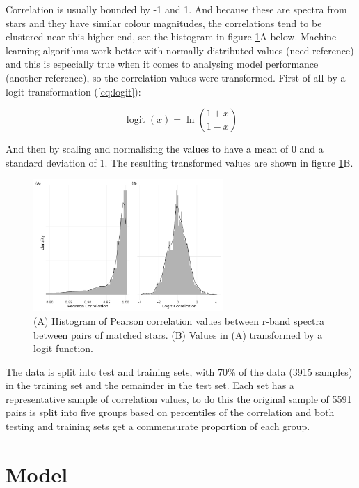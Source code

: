 \documentclass[]{elsarticle} %
\begin{document}
Correlation is usually bounded by -1 and 1. And because these are
spectra from stars and they have similar colour magnitudes, the
correlations tend to be clustered near this higher end, see the
histogram in figure \ref{fig:histograms}A below. Machine learning
algorithms work better with normally distributed values (need reference)
and this is especially true when it comes to analysing model performance
(another reference), so the correlation values were transformed. First
of all by a logit transformation (\ref{eq:logit}):

\begin{equation}
  \displaystyle \operatorname {logit} (x)=\ln \left({\frac {1+x}{1-x}}\right)
  \label{eq:logit}
\end{equation}

And then by scaling and normalising the values to have a mean of 0 and a
standard deviation of 1. The resulting transformed values are shown in
figure \ref{fig:histograms}B.

\begin{figure}
  \includegraphics[width=\columnwidth, height = 5cm]{figures/histograms}
    \caption{(A) Histogram of Pearson correlation values between r-band spectra between pairs of matched stars. (B) Values in (A) transformed by a logit function.}
    \label{fig:histograms}
\end{figure}

The data is split into test and training sets, with 70\% of the data
(3915 samples) in the training set and the remainder in the test set.
Each set has a representative sample of correlation values, to do this
the original sample of 5591 pairs is split into five groups based on
percentiles of the correlation and both testing and training sets get a
commensurate proportion of each group.

\hypertarget{model}{%
\section{Model}\label{model}}
\end{document}
